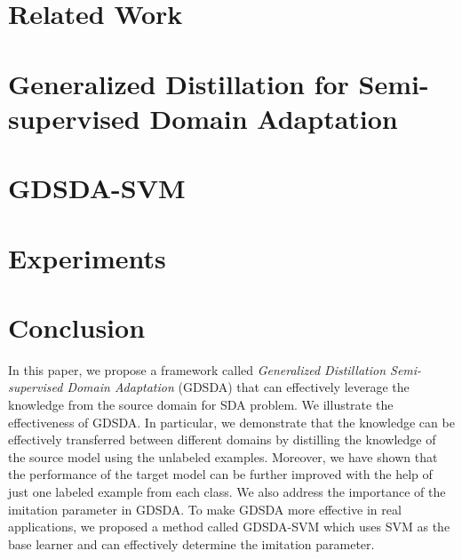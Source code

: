 \documentclass[letterpaper]{article}
\begin{document}
\section{Related Work}\label{sec:work}


\section{Generalized Distillation for Semi-supervised Domain Adaptation}\label{sec:gdda}



\section{GDSDA-SVM}\label{sec:svm}


\section{Experiments}\label{sec:exp}


\section{Conclusion}\label{sec:con}
In this paper, we propose a framework called \textit{Generalized Distillation Semi-supervised Domain Adaptation} (GDSDA) that can effectively leverage the knowledge from the source domain for SDA problem. We illustrate the effectiveness of GDSDA. In particular, we demonstrate that the knowledge can be effectively transferred between different domains by distilling the knowledge of the source model using the unlabeled examples. Moreover, we have shown that the performance of the target model can be further improved with the help of just one labeled example from each class. We also address the importance of the imitation parameter in GDSDA. To make GDSDA more effective in real applications, we proposed a method called GDSDA-SVM which uses SVM as the base learner and can effectively determine the imitation parameter. 


\end{document}

